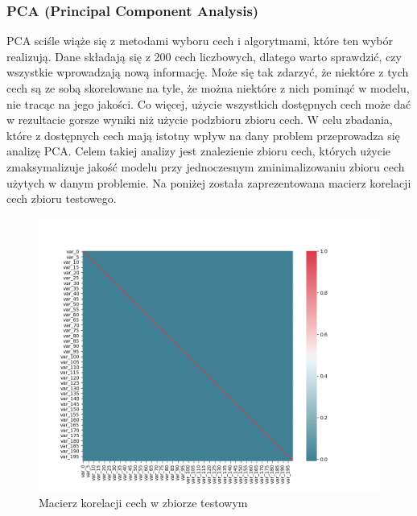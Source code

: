 \documentclass[12pt]{article}
\begin{document}
\subsubsection{PCA (Principal Component Analysis)}
PCA sciśle wiąże się z metodami wyboru cech i algorytmami, które ten wybór realizują.
Dane składają się z 200 cech liczbowych, dlatego warto sprawdzić, czy wszystkie wprowadzają nową informację. Może się tak zdarzyć, że niektóre z tych cech są ze sobą skorelowane na tyle, że można niektóre z nich pominąć w modelu, nie tracąc na jego jakości. Co więcej, użycie wszystkich dostępnych cech może dać w rezultacie gorsze wyniki niż użycie podzbioru zbioru cech. W celu zbadania, które z dostępnych cech mają istotny wpływ na dany problem przeprowadza się analizę PCA. Celem takiej analizy jest znalezienie zbioru cech, których użycie zmaksymalizuje jakość modelu przy jednoczesnym zminimalizowaniu zbioru cech użytych w danym problemie.
\newline
Na poniżej została zaprezentowana macierz korelacji cech zbioru testowego.
\begin{figure}[H]
\centering 
\includegraphics[width = 472pt]{feature_correlation_matrix}
\caption{Macierz korelacji cech w zbiorze testowym}
\label{feature_correlation_matrix}
\end{figure}
\end{document}
